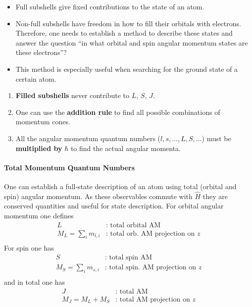 \begin{itemize}
    \item Full subshells give fixed contributions to the state of an atom.
    \item Non-full subshells have freedom in how to fill their orbitals with electrons. Therefore, one needs to establish a method to describe these states and answer the question ``in what orbital and spin angular momentum states are these electrons''?
    \item This method is especially useful when searching for the ground state of a certain atom.
\end{itemize}


\begin{enumerate}
    \item \textbf{Filled subshells} never contribute to $L$, $S$, $J$.
    \item One can use the \textbf{addition rule} to find all possible combinations of momentum cones.
    \item All the angular momentum quantum numbers ($l,s,\dots,L,S,\dots$) must be \textbf{multiplied by} $\boldsymbol{\hbar}$ to find the actual angular momenta.
\end{enumerate}

\paragraph{Total Momentum Quantum Numbers}


One can establish a full-state description of an atom using total (orbital and spin) angular momentum. As these observables commute with $\hat{H}$ they are conserved quantities and useful for state description. For orbital angular momentum one defines
\begin{align*}
    L                   & \text{: total orbital AM}                \\
    M_L=\sum_{i}m_{l,i} & \text{: total orb. AM projection on $z$} \\
\end{align*}
For spin one has
\begin{align*}
    S                   & \text{: total spin AM}                    \\
    M_S=\sum_{i}m_{s,i} & \text{: total spin. AM projection on $z$} \\
\end{align*}
and in total one has
\begin{align*}
    J           & \text{: total AM}                   \\
    M_J=M_L+M_S & \text{: total AM projection on $z$} \\
\end{align*}

